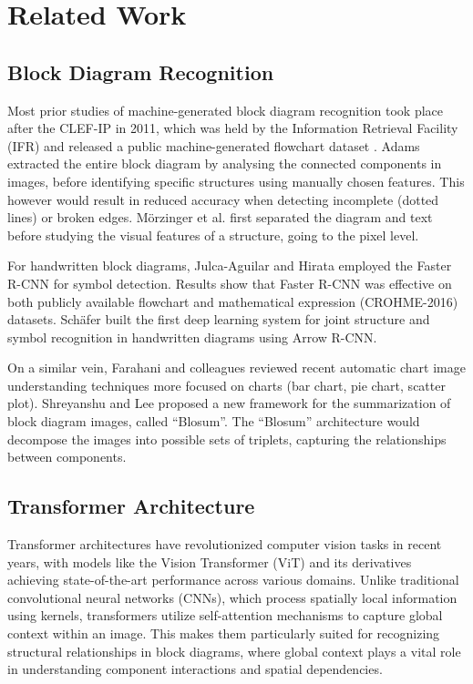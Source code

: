 \section{Related Work}

\subsection{Block Diagram Recognition}
Most prior studies of machine-generated block diagram recognition took place after the CLEF-IP in 2011, which was held by the Information Retrieval Facility (IFR) and released a public machine-generated flowchart dataset \cite{9795274}. Adams \cite{adams_2005_electronic} extracted the entire block diagram by analysing the connected components in images, before identifying specific structures using manually chosen features. This however would result in reduced accuracy when detecting incomplete (dotted lines) or broken edges. Mörzinger et al. \cite{mrzinger_2012_visual} first separated the diagram and text before studying the visual features of a structure, going to the pixel level.

For handwritten block diagrams, Julca-Aguilar and Hirata\cite{DBLP:journals/corr/abs-1712-04833} employed the Faster R-CNN for symbol detection. Results show that Faster R-CNN was effective on both publicly available flowchart and mathematical expression (CROHME-2016) datasets. Schäfer \cite{bernhardschfer_2021_arrow} built the first deep learning system for joint structure and symbol recognition in handwritten diagrams using Arrow R-CNN. 

On a similar vein, Farahani and colleagues \cite{alivasheghanifarahani_2023_automatic} reviewed recent automatic chart image understanding techniques more focused on charts (bar chart, pie chart, scatter plot). Shreyanshu and Lee \cite{bhushan-lee-2022-block} proposed a new framework for the summarization of block diagram images, called “Blosum”. The “Blosum” architecture would decompose the images into possible sets of triplets, capturing the relationships between components. 


\subsection{Transformer Architecture}
Transformer architectures have revolutionized computer vision tasks in recent years, with models like the Vision Transformer (ViT) and its derivatives achieving state-of-the-art performance across various domains. Unlike traditional convolutional neural networks (CNNs), which process spatially local information using kernels, transformers utilize self-attention mechanisms to capture global context within an image. This makes them particularly suited for recognizing structural relationships in block diagrams, where global context plays a vital role in understanding component interactions and spatial dependencies.

